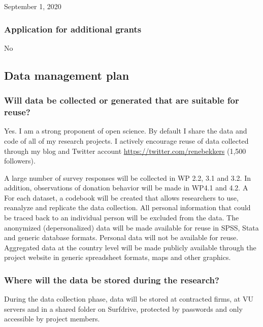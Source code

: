 \documentclass[twocolumn, serif, rga, numeric]{jote-article}
\begin{document}
September 1, 2020 
 {}\subsubsection*{Application for additional grants} 

No 
 {}\subsection*{Data management plan} 

 {}\subsubsection*{Will data be collected or generated that are suitable for reuse?} 

Yes. I am a strong proponent of open science. By default I share the data and code of all of my research projects. I actively encourage reuse of data collected through my blog and Twitter account \url{https://twitter.com/renebekkers} (1,500 followers).

A large number of survey responses will be collected in WP 2.2, 3.1 and 3.2. In addition, observations of donation behavior will be made in WP4.1 and 4.2. A For each dataset, a codebook will be created that allows researchers to use, reanalyze and replicate the data collection.
All personal information that could be traced back to an individual person will be excluded from the data. The anonymized (depersonalized) data will be made available for reuse in SPSS, Stata and generic database formats. Personal data will not be available for reuse.
Aggregated data at the country level will be made publicly available through the project website in generic spreadsheet formats, maps and other graphics.

 {}\subsubsection*{Where will the data be stored during the research?} 

During the data collection phase, data will be stored at contracted firms, at VU servers and in a shared folder on Surfdrive, protected by passwords and only accessible by project members.
\end{document}
